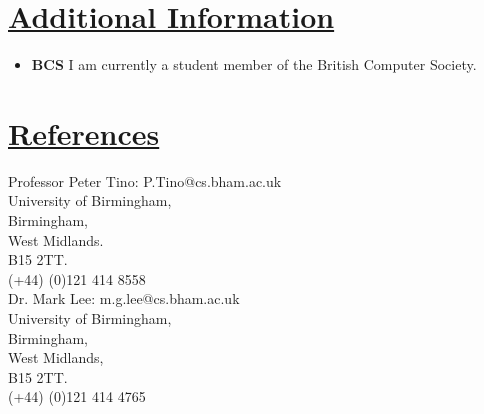 \documentclass[11pt]{article}
\begin{document}
	\vspace{-20pt}
	\hspace{-100pt}\section*{\underline{Additional Information}}
		\begin{itemize}
			\item \textbf{BCS} I am currently a student member of the British Computer Society.
		\end{itemize}

				
	\vspace{-20pt}
	\hspace{-100pt}\section*{\underline{References}}	
				Professor Peter Tino:  P.Tino@cs.bham.ac.uk  \\
				University of Birmingham,\\
				Birmingham, \\
				West Midlands.\\
				B15 2TT.\\
				(+44) (0)121 414 8558\\
	
				\noindent
				Dr. Mark Lee: m.g.lee@cs.bham.ac.uk\\
				University of Birmingham,\\
				Birmingham,\\
				West Midlands,\\
				B15 2TT.\\
				(+44) (0)121 414 4765\\
				
\end{document}
